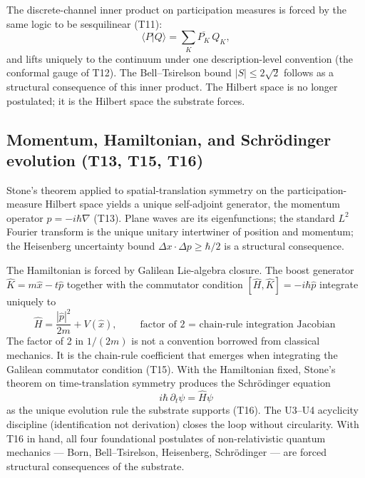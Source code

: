 \documentclass[11pt,a4paper]{article}
\begin{document}
The discrete-channel inner product on participation measures is forced by the same logic to be sesquilinear (T11):
\begin{equation}
\langle P | Q \rangle = \sum_K \overline{P_K} \, Q_K,
\end{equation}
and lifts uniquely to the continuum under one description-level convention (the conformal gauge of T12). The Bell--Tsirelson bound $|S| \leq 2\sqrt{2}$ follows as a structural consequence of this inner product. The Hilbert space is no longer postulated; it is the Hilbert space the substrate forces.

\subsection{Momentum, Hamiltonian, and Schr\"odinger evolution (T13, T15, T16)}

Stone's theorem applied to spatial-translation symmetry on the participation-measure Hilbert space yields a unique self-adjoint generator, the momentum operator $\hat p = -i\hbar \nabla$ (T13). Plane waves are its eigenfunctions; the standard $L^2$ Fourier transform is the unique unitary intertwiner of position and momentum; the Heisenberg uncertainty bound $\Delta x \cdot \Delta p \geq \hbar/2$ is a structural consequence.

The Hamiltonian is forced by Galilean Lie-algebra closure. The boost generator $\hat K = m\hat x - t \hat p$ together with the commutator condition $[\hat H, \hat K] = -i\hbar \hat p$ integrate uniquely to
\begin{equation}
\hat H = \frac{|\hat p|^2}{2m} + V(\hat x), \qquad
\boxed{\;\text{factor of 2 = chain-rule integration Jacobian}\;}
\end{equation}
The factor of 2 in $1/(2m)$ is not a convention borrowed from classical mechanics. It is the chain-rule coefficient that emerges when integrating the Galilean commutator condition (T15). With the Hamiltonian fixed, Stone's theorem on time-translation symmetry produces the Schr\"odinger equation
\begin{equation}
i\hbar \, \partial_t \psi = \hat H \psi
\end{equation}
as the unique evolution rule the substrate supports (T16). The U3--U4 acyclicity discipline (identification not derivation) closes the loop without circularity. With T16 in hand, all four foundational postulates of non-relativistic quantum mechanics --- Born, Bell--Tsirelson, Heisenberg, Schr\"odinger --- are forced structural consequences of the substrate.
\end{document}
